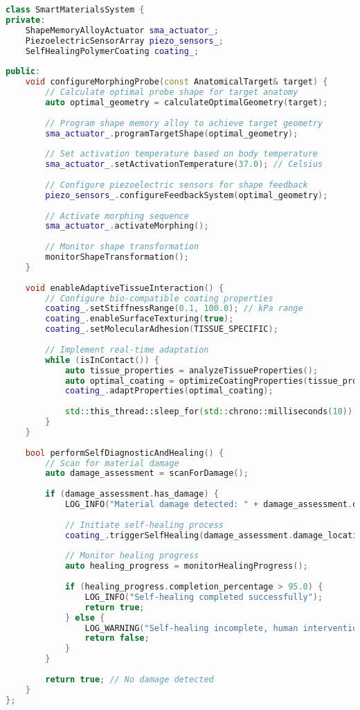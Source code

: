 \begin{lstlisting}[language=C++, caption={Smart Materials Integration}, label={lst:smart-materials}]
class SmartMaterialsSystem {
private:
    ShapeMemoryAlloyActuator sma_actuator_;
    PiezoelectricSensorArray piezo_sensors_;
    SelfHealingPolymerCoating coating_;
    
public:
    void configureMorphingProbe(const AnatomicalTarget& target) {
        // Calculate optimal probe shape for target anatomy
        auto optimal_geometry = calculateOptimalGeometry(target);
        
        // Program shape memory alloy to achieve target geometry
        sma_actuator_.programTargetShape(optimal_geometry);
        
        // Set activation temperature based on body temperature
        sma_actuator_.setActivationTemperature(37.0); // Celsius
        
        // Configure piezoelectric sensors for shape feedback
        piezo_sensors_.configureFeedbackSystem(optimal_geometry);
        
        // Activate morphing sequence
        sma_actuator_.activateMorphing();
        
        // Monitor shape transformation
        monitorShapeTransformation();
    }
    
    void enableAdaptiveTissueInteraction() {
        // Configure bio-compatible coating properties
        coating_.setStiffnessRange(0.1, 100.0); // kPa range
        coating_.enableSurfaceTexturing(true);
        coating_.setMolecularAdhesion(TISSUE_SPECIFIC);
        
        // Implement real-time adaptation
        while (isInContact()) {
            auto tissue_properties = analyzeTissueProperties();
            auto optimal_coating = optimizeCoatingProperties(tissue_properties);
            coating_.adaptProperties(optimal_coating);
            
            std::this_thread::sleep_for(std::chrono::milliseconds(10));
        }
    }
    
    bool performSelfDiagnosticAndHealing() {
        // Scan for material damage
        auto damage_assessment = scanForDamage();
        
        if (damage_assessment.has_damage) {
            LOG_INFO("Material damage detected: " + damage_assessment.description);
            
            // Initiate self-healing process
            coating_.triggerSelfHealing(damage_assessment.damage_locations);
            
            // Monitor healing progress
            auto healing_progress = monitorHealingProgress();
            
            if (healing_progress.completion_percentage > 95.0) {
                LOG_INFO("Self-healing completed successfully");
                return true;
            } else {
                LOG_WARNING("Self-healing incomplete, human intervention required");
                return false;
            }
        }
        
        return true; // No damage detected
    }
};
\end{lstlisting}

